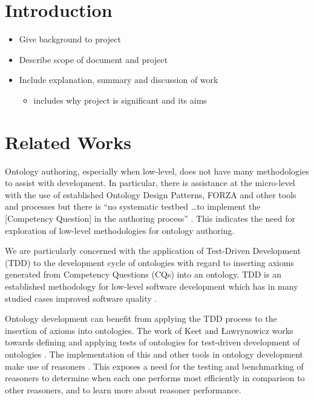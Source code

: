 \documentclass[draft]{sig-alternate-05-2015}
\newcommand{\todo}[1][]{\ifdraft{\ifthenelse{\isempty{#1}}{\hl{(TODO)}}{\hl{(TODO: #1)}}}{}}
\begin{document}
\printccsdesc


\section{Introduction}
\todo
\begin{itemize}
  \item Give background to project
  \item Describe scope of document and project
  \item Include explanation, summary and discussion of work
  \begin{itemize}
    \item includes why project is significant and its aims
  \end{itemize}
\end{itemize}

\section{Related Works}

Ontology authoring, especially when low-level, does not have many methodologies to assist with development. In particular, there is assistance at the micro-level with the use of established Ontology Design Patterns, FORZA and other tools and processes but there is ``no systematic testbed \ldots to implement the [Competency Question] in the authoring process'' \cite{DBLP:journals/corr/KeetL15}. This indicates the need for exploration of low-level methodologies for ontology authoring.

We are particularly concerned with the application of Test-Driven Development (TDD) to the development cycle of ontologies with regard to inserting axioms generated from Competency Questions (CQs) into an ontology. TDD is an established methodology for low-level software development which has in many studied cases improved software quality \cite{DBLP:journals/infsof/BissiNE16}. 

Ontology development can benefit from applying the TDD process to the insertion of axioms into ontologies. The work of Keet and \L{}awrynowicz works towards defining and applying tests of ontologies for test-driven development of ontologies \cite{DBLP:journals/corr/KeetL15,DBLP:conf/esws/KeetL16}. The implementation of this \cite{DBLP:conf/dlog/LawrynowiczK16} and other tools in ontology development make use of reasoners \cite{DBLP:journals/corr/KeetL15}. This exposes a need for the testing and benchmarking of reasoners to determine when each one performs most efficiently in comparison to other reasoners, and to learn more about reasoner performance.
\end{document}
